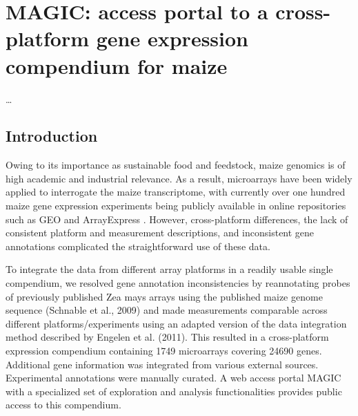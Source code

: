 \chapter{MAGIC: access portal to a cross-platform gene expression compendium for maize}\label{ch:magic}

\ldots

\instructionsintroduction




\section{Introduction}
Owing to its importance as sustainable food and feedstock,
maize genomics is of high academic and industrial relevance.
As a result, microarrays have been widely applied to interrogate
the maize transcriptome, with currently over one hundred maize gene expression 
experiments being publicly available in online repositories
such as GEO \cite{Barrett2011} and ArrayExpress \cite{Parkinson2009}. 
However, cross-platform differences, the lack of
consistent platform and measurement descriptions, and inconsistent 
gene annotations complicated the straightforward
use of these data.

To integrate the data from different array platforms in a readily 
usable single compendium, we resolved gene annotation
inconsistencies by reannotating probes of previously published
Zea mays arrays using the published maize genome sequence
(Schnable et al., 2009) and made measurements comparable
across different platforms/experiments using an adapted version
of the data integration method described by Engelen et al. (2011).
This resulted in a cross-platform expression compendium containing 
1749 microarrays covering 24690 genes. Additional
gene information was integrated from various external sources.
Experimental annotations were manually curated. A web access
portal MAGIC with a specialized set of exploration and analysis
functionalities provides public access to this compendium.



